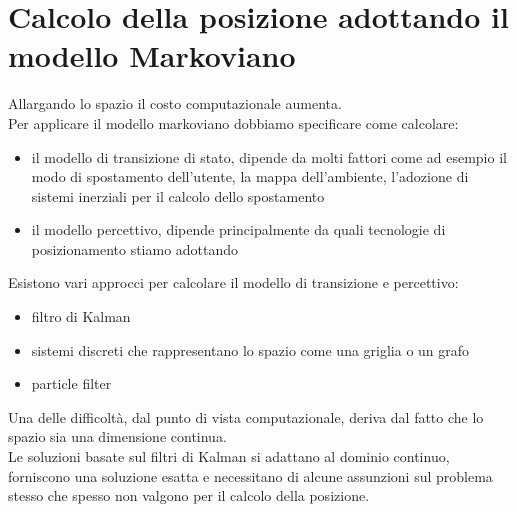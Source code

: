 \section{Calcolo della posizione adottando il modello Markoviano}
Allargando lo spazio il costo computazionale aumenta.
\\ Per applicare il modello markoviano dobbiamo specificare come calcolare: 
\begin{itemize}
    \item il modello di transizione di stato, dipende da molti fattori come ad esempio il modo di spostamento dell'utente, la mappa dell'ambiente, l'adozione di sistemi inerziali per il calcolo dello spostamento
    \item il modello percettivo, dipende principalmente da quali tecnologie di posizionamento stiamo adottando
\end{itemize}

Esistono vari approcci per calcolare il modello di transizione e percettivo: 
\begin{itemize}
    \item filtro di Kalman
    \item sistemi discreti che rappresentano lo spazio come una griglia o un grafo
    \item particle filter
\end{itemize}

Una delle difficoltà, dal punto di vista computazionale, deriva dal fatto che lo spazio sia una dimensione continua.
\\ Le soluzioni basate sul filtri di Kalman si adattano al dominio continuo, forniscono una soluzione esatta e necessitano di alcune assunzioni sul problema stesso che spesso non valgono per il calcolo della posizione.


